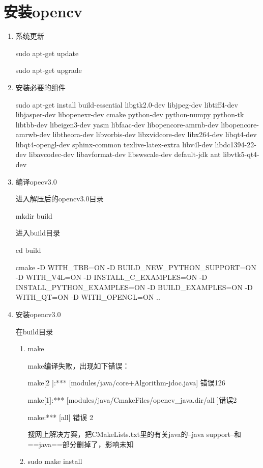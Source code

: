 \documentclass[a4paper,12pt]{article}
\begin{document}
\section{安装opencv}

\begin{enumerate}

\item 系统更新

sudo apt-get update

sudo apt-get upgrade

\item 安装必要的组件

sudo apt-get install build-essential libgtk2.0-dev libjpeg-dev libtiff4-dev libjasper-dev libopenexr-dev cmake python-dev python-numpy python-tk libtbb-dev libeigen3-dev yasm libfaac-dev libopencore-amrnb-dev libopencore-amrwb-dev libtheora-dev libvorbis-dev libxvidcore-dev libx264-dev libqt4-dev libqt4-opengl-dev sphinx-common texlive-latex-extra libv4l-dev libdc1394-22-dev libavcodec-dev libavformat-dev libswscale-dev default-jdk ant libvtk5-qt4-dev

\item 编译opecv3.0

进入解压后的opencv3.0目录

mkdir build

进入build目录

cd build

cmake -D WITH\_TBB=ON -D BUILD\_NEW\_PYTHON\_SUPPORT=ON -D WITH\_V4L=ON -D INSTALL\_C\_EXAMPLES=ON -D INSTALL\_PYTHON\_EXAMPLES=ON -D BUILD\_EXAMPLES=ON -D WITH\_QT=ON -D WITH\_OPENGL=ON ..


\item 安装opencv3.0

在build目录

\begin{enumerate}

\item make  

make编译失败，出现如下错误：

make[2 ]:*** [modules/java/core+Algorithm-jdoc.java] 错误126

make[1]:*** [modules/java/CmakeFiles/opencv\_java.dir/all ]错误2

make:*** [all] 错误 2

搜网上解决方案，把CMakeLists.txt里的有关java的--java support--和==java==部分删掉了，影响未知

\item sudo make install


\end{enumerate}
\end{enumerate}
\end{document}
